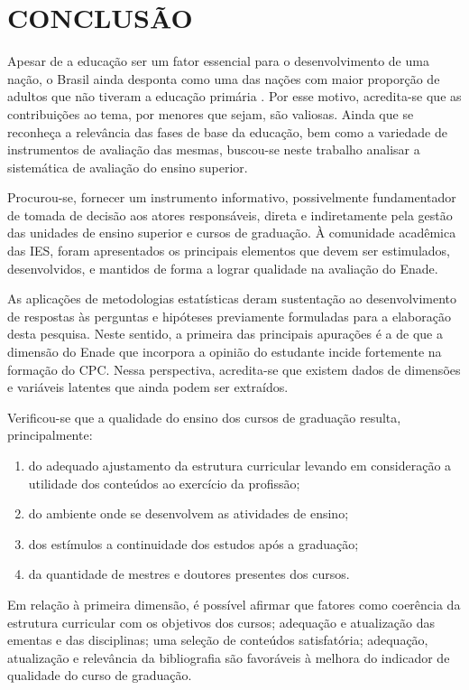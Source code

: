 
\section{CONCLUSÃO}

Apesar de a educação ser um fator essencial para o desenvolvimento de uma nação, o Brasil ainda desponta como uma das nações com maior proporção de adultos que não tiveram a educação primária \cite[p.~44]{OCDE_2017}. Por esse motivo, acredita-se que as contribuições ao tema, por menores que sejam, são valiosas. Ainda que se reconheça a relevância das fases de base da educação, bem como a variedade de instrumentos de avaliação das mesmas, buscou-se neste trabalho analisar a sistemática de avaliação do ensino superior. 

Procurou-se, fornecer um instrumento informativo, possivelmente fundamentador de tomada de decisão aos atores responsáveis, direta e indiretamente pela gestão das unidades de ensino superior e cursos de graduação. À comunidade acadêmica das IES, foram apresentados os principais elementos que devem ser estimulados, desenvolvidos, e mantidos de forma a lograr qualidade na avaliação do Enade.

As aplicações de metodologias estatísticas deram sustentação ao desenvolvimento de respostas às perguntas e hipóteses previamente formuladas para a elaboração desta pesquisa. Neste sentido, a primeira das principais apurações é a de que a dimensão do Enade que incorpora a opinião do estudante incide fortemente na formação do CPC. Nessa perspectiva, acredita-se que existem dados de dimensões e variáveis latentes que ainda podem ser extraídos.

Verificou-se que a qualidade do ensino dos cursos de graduação resulta, principalmente:
\begin{enumerate}[label=\roman*)]
\item do adequado ajustamento da estrutura curricular levando em consideração a utilidade dos conteúdos ao exercício da profissão;
\item do ambiente onde se desenvolvem as atividades de ensino; 
\item dos estímulos a continuidade dos estudos após a graduação;
\item da quantidade de mestres e doutores presentes dos cursos.
\end{enumerate}

Em relação à primeira dimensão, é possível afirmar que fatores como coerência da estrutura curricular com os objetivos dos cursos; adequação e atualização das ementas e das disciplinas; uma seleção de conteúdos satisfatória; adequação, atualização e relevância da bibliografia são favoráveis à melhora do indicador de qualidade do curso de graduação.

